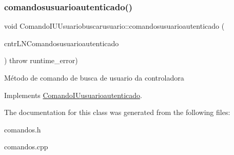 \subsubsection{\texorpdfstring{comandosusuarioautenticado()}{comandosusuarioautenticado()}}
{\footnotesize\ttfamily void Comando\+I\+U\+Usuariobuscarusuario\+::comandosusuarioautenticado (\begin{DoxyParamCaption}\item[{\hyperlink{classILNComandosusuarioautenticado}{I\+L\+N\+Comandosusuarioautenticado} $\ast$}]{cntr\+L\+N\+Comandosusuarioautenticado }\end{DoxyParamCaption}) throw  runtime\+\_\+error) \hspace{0.3cm}{\ttfamily [virtual]}}

Método de comando de busca de usuario da controladora 

Implements \hyperlink{classComandoIUusuarioautenticado}{Comando\+I\+Uusuarioautenticado}.



The documentation for this class was generated from the following files\+:\begin{DoxyCompactItemize}
\item 
comandos.\+h\item 
comandos.\+cpp\end{DoxyCompactItemize}
